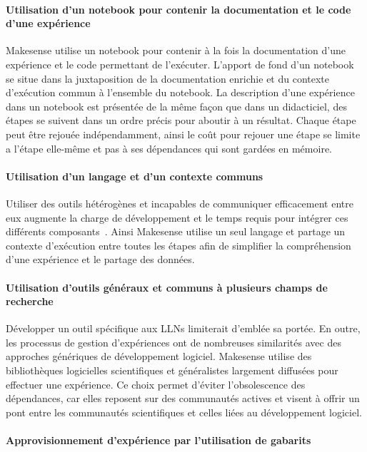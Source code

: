 \paragraph{Utilisation d'un notebook pour contenir la documentation et le code d'une expérience}

Makesense utilise un notebook pour contenir à la fois la documentation d'une expérience et le code permettant de l'exécuter.
L'apport de fond d'un notebook se situe dans la juxtaposition de la documentation enrichie et du contexte d'exécution commun à l'ensemble du notebook.
La description d'une expérience dans un notebook est présentée de la même façon que dans un didacticiel, des étapes se suivent dans un ordre précis pour aboutir à un résultat.
Chaque étape peut être rejouée indépendamment, ainsi le coût pour rejouer une étape se limite a l'étape elle-même et pas à ses dépendances qui sont gardées en mémoire.

\paragraph{Utilisation d'un langage et d'un contexte communs}

Utiliser des outils hétérogènes et incapables de communiquer efficacement entre eux augmente la charge de développement et le temps requis pour intégrer ces différents composants~\cite{stanisic2015effective}.
Ainsi Makesense utilise un seul langage et partage un contexte d'exécution entre toutes les étapes afin de simplifier la compréhension d'une expérience et le partage des données.

\paragraph{Utilisation d'outils généraux et communs à plusieurs champs de recherche}

Développer un outil spécifique aux \ac{LLN}s limiterait d'emblée sa portée.
En outre, les processus de gestion d'expériences ont de nombreuses similarités avec des approches génériques de développement logiciel.
Makesense utilise des bibliothèques logicielles scientifiques et généralistes largement diffusées pour effectuer une expérience.
Ce choix permet d'éviter l'obsolescence des dépendances, car elles reposent sur des communautés actives et visent à offrir un pont entre les communautés scientifiques et celles liées au développement logiciel.

\paragraph{Approvisionnement d'expérience par l'utilisation de gabarits}

